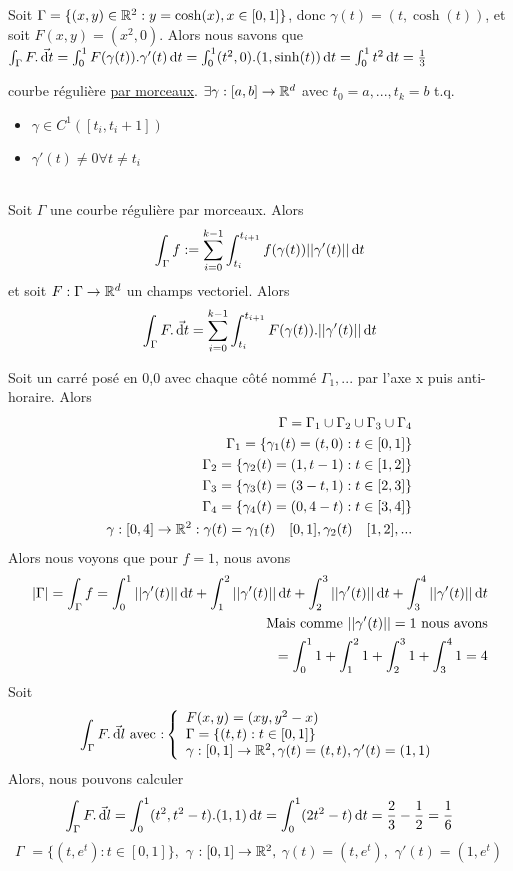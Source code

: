 \documentclass[12pt,a4paper]{article}
\begin{document}
 Soit $\Gamma = \{(x,y) \in \R^2 : y = \cosh(x), x\in [0,1]\}$, donc $\gamma(t) = (t,\cosh(t))$, et soit $F(x,y) = (x^2,0)$. Alors nous savons que $\int_\Gamma F. \vec{\deriv{t}} =  \int_0^1F(\gamma(t)).\gamma'(t)\deriv{t} = \int_0^1 (t^2, 0).(1,\sinh(t)) \deriv{t} = \int_0^1 t^2 \deriv{t} = \frac{1}{3}$
\begin{boite}
	 courbe régulière \uline{par morceaux}. $\exists \gamma : [a,b] \to \R^d$ avec $t_0=a,...,t_k = b$ t.q. 
	\begin{itemize}
		\item	$\gamma \in C^1 ([t_i,t_i+1])$
		\item 	$\gamma'(t) \neq 0 \forall t\neq t_i$
	\end{itemize}~\\
	 Soit $\Gamma$ une courbe régulière par morceaux. Alors \[\int_\Gamma f := \somme{k-1}{i=0} \int_{t_i}^{t_{i+1}} f(\gamma(t)) ||\gamma'(t)|| \deriv{t}\]
	et soit $F : \Gamma \to \R^d$ un champs vectoriel. Alors 
	\[\int_\Gamma F.\vec{\deriv{t}} = \somme{k-1}{i=0} \int_{t_i}^{t_{i+1}} F(\gamma(t)).||\gamma'(t)|| \deriv{t}\]
\end{boite}
 Soit un carré posé en 0,0 avec chaque côté nommé $\Gamma_1,...$ par l'axe x puis anti-horaire. Alors 
\begin{align*}
\Gamma = \Gamma_1 \cup \Gamma_2 \cup \Gamma_3 \cup \Gamma_4\\
\Gamma_1 = \{\gamma_1(t) = (t,0) :  t\in [0,1]\}\\
\Gamma_2 = \{\gamma_2(t) = (1,t-1) :  t\in [1,2]\}\\
\Gamma_3 = \{\gamma_3(t) = (3-t,1) :  t\in [2,3]\}\\
\Gamma_4 = \{\gamma_4(t) = (0,4-t) :  t\in [3,4]\}\\
\gamma : [0,4] \to \R^2 : \gamma(t) = \gamma_1(t)\quad [0,1], \gamma_2(t) \quad [1,2], ...
\end{align*}
Alors nous voyons que pour $f=1$, nous avons 
\begin{align*}
|\Gamma| = \int_\Gamma f = \int_0^1 ||\gamma'(t)|| \deriv{t} + \int_1^2 ||\gamma'(t)|| \deriv{t} + \int_2^3||\gamma'(t)|| \deriv{t} + \int_3^4 ||\gamma'(t)|| \deriv{t}\\
\mbox{Mais comme } ||\gamma'(t)|| = 1 \mbox{ nous avons}\\
= \int_0^1 1 + \int_1^2 1 + \int_2^3 1 + \int_3^4 1 = 4
\end{align*}
 Soit 
\[
\int_\Gamma F. \vec{\deriv{l}} \text{ avec :}
\left\{\begin{array}{l}
	F(x,y) = (xy, y^2-x)\\
	\Gamma = \{(t,t) : t\in [0,1]\}\\
	\gamma : [0,1] \to \R^2, \gamma(t) = (t,t), \gamma'(t) = (1,1)
\end{array}\right.\]
Alors, nous pouvons calculer \[\int_\Gamma F.\vec{\deriv{l}} = \int_0^1 (t^2, t^2-t).(1,1) \deriv{t} = \int_0^1 (2t^2-t)\deriv{t} = \frac{2}{3}-\frac{1}{2} = \frac{1}{6}\]\ \^{$\Gamma$} $= \{(t,e^t) : t \in [0,1]\},$ \^{$\gamma$} $: [0,1] \to \R^2,$ \^{$\gamma$}$(t) = (t,e^t),$ \^{$\gamma'$}$(t) = (1,e^t)$
\end{document}
